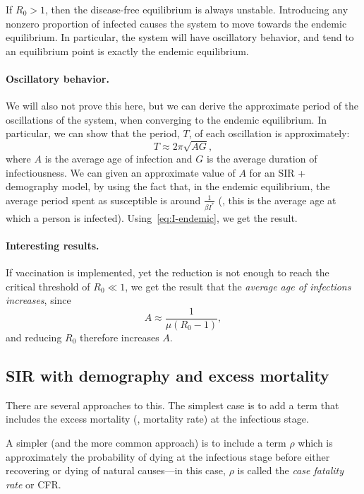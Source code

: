 \documentclass[12pt]{article}
\begin{document}
If $R_0 > 1$, then the disease-free equilibrium is always unstable. Introducing any nonzero proportion of infected causes the system to move towards the endemic equilibrium. In particular, the system will have oscillatory behavior, and tend to an equilibrium point is exactly the endemic equilibrium.

\paragraph{Oscillatory behavior.} We will also not prove this here, but we can derive the approximate period of the oscillations of the system, when converging to the endemic equilibrium. In particular, we can show that the period, $T$, of each oscillation is approximately:
\[
T \approx 2\pi\sqrt{AG},
\]
where $A$ is the average age of infection and $G$ is the average duration of infectiousness. We can given an approximate value of $A$ for an SIR + demography model, by using the fact that, in the endemic equilibrium, the average period spent as susceptible is around $\frac{1}{\beta I^*}$ (\ie, this is the average age at which a person is infected). Using~\eqref{eq:I-endemic}, we get the result.

\paragraph{Interesting results.} If vaccination is implemented, yet the reduction is not enough to reach the critical threshold of $R_0 \ll 1$, we get the result that the \emph{average age of infections increases}, since
\[
A \approx \frac{1}{\mu(R_0 - 1)},
\]
and reducing $R_0$ therefore increases $A$.

\subsection{SIR with demography and excess mortality}
There are several approaches to this. The simplest case is to add a term that includes the excess mortality (\ie, mortality rate) at the infectious stage.

A simpler (and the more common approach) is to include a term $\rho$ which is approximately the probability of dying at the infectious stage before either recovering or dying of natural causes---in this case, $\rho$ is called the \emph{case fatality rate} or CFR.
\end{document}
